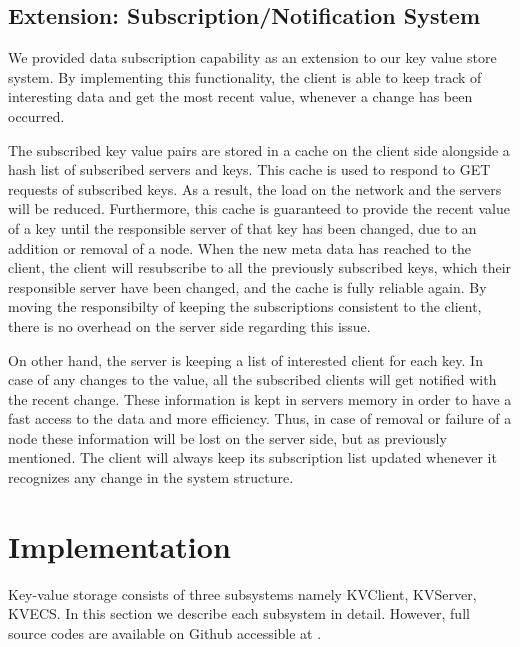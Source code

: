 \documentclass{sig-alternate}
\begin{document}
\subsection{Extension: Subscription/Notification System }\label{extension_sec}

We provided data subscription capability as an extension to our key value store system. By implementing this functionality, the client is able to keep track of interesting data and get the most recent value, whenever a change has been occurred. 

The subscribed key value pairs are stored in a cache on the client side alongside a hash list of subscribed servers and keys. This cache is used to respond to GET requests of subscribed keys. As a result, the load on the network and the servers will be reduced. Furthermore, this cache is guaranteed to provide the recent value of a key until the responsible server of that key has been changed, due to an addition or removal of a node. When the new meta data has reached to the client, the client will resubscribe to all the previously subscribed keys, which their responsible server have been changed, and the cache is fully reliable again. By moving the responsibilty of keeping the subscriptions consistent to the client, there is no overhead on the server side regarding this issue.

On other hand, the server is keeping a list of interested client for each key. In case of any changes to the value, all the subscribed clients will get notified with the recent change. These information is kept in servers memory in order to have a fast access to the data and more efficiency. Thus, in case of removal or failure of a node these information will be lost on the server side, but as previously mentioned. The client will always keep its subscription list updated whenever it recognizes any change in the system structure.


\section{Implementation}\label{implementation}
Key-value storage consists of three subsystems namely KVClient, KVServer, KVECS. 
In this section we describe each subsystem in detail. However, full source codes are available on Github accessible at \cite{github}. 
\end{document}
